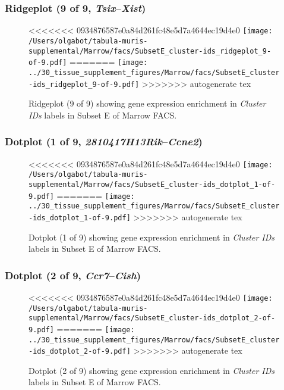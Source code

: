 \clearpage

\subsubsection{Ridgeplot (9 of 9, \emph{Tsix}--\emph{Xist})}
\begin{figure}[h]
\centering
<<<<<<< 0934876587e0a84d261fc48e5d7a4644ec19d4e0
\texttt{[image: /Users/olgabot/tabula-muris-supplemental/Marrow/facs/SubsetE\_cluster-ids\_ridgeplot\_9-of-9.pdf]}
=======
\texttt{[image: ../30\_tissue\_supplement\_figures/Marrow/facs/SubsetE\_cluster-ids\_ridgeplot\_9-of-9.pdf]}
>>>>>>> autogenerate tex

\caption{ Ridgeplot (9 of 9)  showing gene expression enrichment in \emph{Cluster IDs} labels in Subset E of Marrow FACS. }
\end{figure}


\clearpage

\subsubsection{Dotplot (1 of 9, \emph{2810417H13Rik}--\emph{Ccne2})}
\begin{figure}[h]
\centering
<<<<<<< 0934876587e0a84d261fc48e5d7a4644ec19d4e0
\texttt{[image: /Users/olgabot/tabula-muris-supplemental/Marrow/facs/SubsetE\_cluster-ids\_dotplot\_1-of-9.pdf]}
=======
\texttt{[image: ../30\_tissue\_supplement\_figures/Marrow/facs/SubsetE\_cluster-ids\_dotplot\_1-of-9.pdf]}
>>>>>>> autogenerate tex

\caption{ Dotplot (1 of 9)  showing gene expression enrichment in \emph{Cluster IDs} labels in Subset E of Marrow FACS. }
\end{figure}


\clearpage

\subsubsection{Dotplot (2 of 9, \emph{Ccr7}--\emph{Cish})}
\begin{figure}[h]
\centering
<<<<<<< 0934876587e0a84d261fc48e5d7a4644ec19d4e0
\texttt{[image: /Users/olgabot/tabula-muris-supplemental/Marrow/facs/SubsetE\_cluster-ids\_dotplot\_2-of-9.pdf]}
=======
\texttt{[image: ../30\_tissue\_supplement\_figures/Marrow/facs/SubsetE\_cluster-ids\_dotplot\_2-of-9.pdf]}
>>>>>>> autogenerate tex

\caption{ Dotplot (2 of 9)  showing gene expression enrichment in \emph{Cluster IDs} labels in Subset E of Marrow FACS. }
\end{figure}


